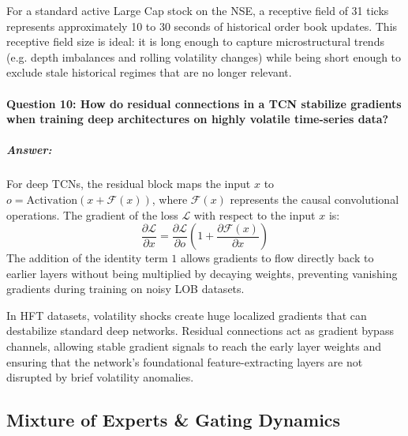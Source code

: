 \documentclass[11pt,a4paper]{article}
\begin{document}
For a standard active Large Cap stock on the NSE, a receptive field of 31 ticks represents approximately 10 to 30 seconds of historical order book updates. This receptive field size is ideal: it is long enough to capture microstructural trends (e.g. depth imbalances and rolling volatility changes) while being short enough to exclude stale historical regimes that are no longer relevant.

\paragraph{Question 10: How do residual connections in a TCN stabilize gradients when training deep architectures on highly volatile time-series data?}
\subparagraph{Answer:}
For deep TCNs, the residual block maps the input $x$ to $o = \text{Activation}(x + \mathcal{F}(x))$, where $\mathcal{F}(x)$ represents the causal convolutional operations. The gradient of the loss $\mathcal{L}$ with respect to the input $x$ is:
\begin{equation}
    \frac{\partial \mathcal{L}}{\partial x} = \frac{\partial \mathcal{L}}{\partial o} \left( 1 + \frac{\partial \mathcal{F}(x)}{\partial x} \right)
\end{equation}
The addition of the identity term $1$ allows gradients to flow directly back to earlier layers without being multiplied by decaying weights, preventing vanishing gradients during training on noisy LOB datasets.

In HFT datasets, volatility shocks create huge localized gradients that can destabilize standard deep networks. Residual connections act as gradient bypass channels, allowing stable gradient signals to reach the early layer weights and ensuring that the network's foundational feature-extracting layers are not disrupted by brief volatility anomalies.

\subsection{Mixture of Experts & Gating Dynamics}
\end{document}
